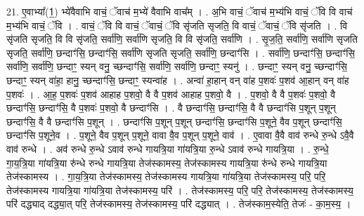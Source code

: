 \documentclass[17pt]{extarticle}
\begin{document}
21. ए॒वाभ्या᳚(1॒) भ्ये॑वैवाभि वाचं॒ ॅवाच॑ म॒भ्ये॑ वैवाभि वाच᳚म् । . अ॒भि वाचं॒ ॅवाच॑ म॒भ्य॑भि वाचं॒ ॅवि वि वाच॑ म॒भ्य॑भि वाचं॒ ॅवि । . वाचं॒ ॅवि वि वाचं॒ ॅवाचं॒ ॅवि सृ॑जति सृजति॒ वि वाचं॒ ॅवाचं॒ ॅवि सृ॑जति । . वि सृ॑जति सृजति॒ वि वि सृ॑जति॒ सर्वा॑णि॒ सर्वा॑णि सृजति॒ वि वि सृ॑जति॒ सर्वा॑णि । . सृ॒ज॒ति॒ सर्वा॑णि॒ सर्वा॑णि सृजति सृजति॒ सर्वा॑णि॒ छन्दाꣳ॑सि॒ छन्दाꣳ॑सि॒ सर्वा॑णि सृजति सृजति॒ सर्वा॑णि॒ छन्दाꣳ॑सि । . सर्वा॑णि॒ छन्दाꣳ॑सि॒ छन्दाꣳ॑सि॒ सर्वा॑णि॒ सर्वा॑णि॒ छन्दाꣳ॒॒ स्यन् वनु॒ च्छन्दाꣳ॑सि॒ सर्वा॑णि॒ सर्वा॑णि॒ छन्दाꣳ॒॒ स्यनु॑ । . छन्दाꣳ॒॒ स्यन् वनु॒ च्छन्दाꣳ॑सि॒ छन्दाꣳ॒॒ स्यन् वा॑हा॒ हानु॒ च्छन्दाꣳ॑सि॒ छन्दाꣳ॒॒ स्यन्वा॑ह । . अन्वा॑ हा॒हान् वन् वा॑ह प॒शवः॑ प॒शव॑ आ॒हान् वन् वा॑ह प॒शवः॑ । . आ॒ह॒ प॒शवः॑ प॒शव॑ आहाह प॒शवो॒ वै वै प॒शव॑ आहाह प॒शवो॒ वै । . प॒शवो॒ वै वै प॒शवः॑ प॒शवो॒ वै छन्दाꣳ॑सि॒ छन्दाꣳ॑सि॒ वै प॒शवः॑ प॒शवो॒ वै छन्दाꣳ॑सि । . वै छन्दाꣳ॑सि॒ छन्दाꣳ॑सि॒ वै वै छन्दाꣳ॑सि प॒शून् प॒शून् छन्दाꣳ॑सि॒ वै वै छन्दाꣳ॑सि प॒शून् । . छन्दाꣳ॑सि प॒शून् प॒शून् छन्दाꣳ॑सि॒ छन्दाꣳ॑सि प॒शूने॒ वैव प॒शून् छन्दाꣳ॑सि॒ छन्दाꣳ॑सि प॒शूने॒व । . प॒शूने॒ वैव प॒शून् प॒शूने॒ वावा वै॒व प॒शून् प॒शूने॒ वाव॑ । . ए॒वावा वै॒वै वाव॑ रुन्धे रु॒न्धे ऽवै॒वै वाव॑ रुन्धे । . अव॑ रुन्धे रु॒न्धे ऽवाव॑ रुन्धे गायत्रि॒या गा॑यत्रि॒या रु॒न्धे ऽवाव॑ रुन्धे गायत्रि॒या । . रु॒न्धे॒ गा॒य॒त्रि॒या गा॑यत्रि॒या रु॑न्धे रुन्धे गायत्रि॒या तेज॑स्कामस्य॒ तेज॑स्कामस्य गायत्रि॒या रु॑न्धे रुन्धे गायत्रि॒या तेज॑स्कामस्य । . गा॒य॒त्रि॒या तेज॑स्कामस्य॒ तेज॑स्कामस्य गायत्रि॒या गा॑यत्रि॒या तेज॑स्कामस्य॒ परि॒ परि॒ तेज॑स्कामस्य गायत्रि॒या गा॑यत्रि॒या तेज॑स्कामस्य॒ परि॑ । . तेज॑स्कामस्य॒ परि॒ परि॒ तेज॑स्कामस्य॒ तेज॑स्कामस्य॒ परि॑ दद्ध्याद् दद्ध्या॒त् परि॒ तेज॑स्कामस्य॒ तेज॑स्कामस्य॒ परि॑ दद्ध्यात् । . तेज॑स्काम॒स्येति॒ तेजः॑ - का॒म॒स्य॒ । \newline
\end{document}
